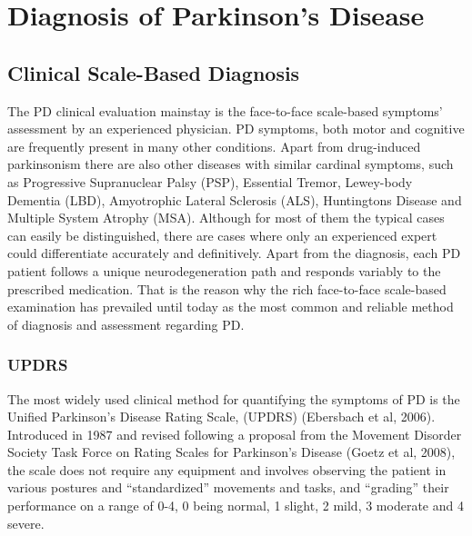 \chapter{Diagnosis of Parkinson's Disease}
\label{ch:diagnosis}
\pagestyle{fancy}
\fancyhf{}
\fancyhead[OC]{\leftmark}
\fancyhead[EC]{\rightmark}
\cfoot{\thepage}


\section{Clinical Scale-Based Diagnosis}
\label{sec:scaleBased}
The \gls{PD} clinical evaluation mainstay is the face-to-face scale-based symptoms' assessment by an experienced physician. \gls{PD} symptoms, both motor and cognitive are frequently present in many other conditions. Apart from drug-induced parkinsonism there are also other diseases with similar cardinal symptoms, such as Progressive Supranuclear Palsy (\gls{PSP}), Essential Tremor, Lewey-body Dementia (\gls{LBD}), Amyotrophic Lateral Sclerosis (\gls{ALS}), Huntingtons Disease and Multiple System Atrophy (\gls{MSA}). Although for most of them the typical cases can easily be distinguished, there are cases where only an experienced expert could differentiate accurately and definitively. Apart from the diagnosis, each \gls{PD} patient follows a unique neurodegeneration path and responds variably to the prescribed medication. That is the reason why the rich face-to-face scale-based examination has prevailed until today as the most common and reliable method of diagnosis and assessment regarding \gls{PD}. 


\subsection{UPDRS}
\label{subsec:updrs}
The most widely used clinical method for quantifying the symptoms of \gls{PD} is the Unified Parkinson's Disease Rating Scale, (\gls{UPDRS}) (Ebersbach et al, 2006). Introduced in 1987 and revised following a proposal from the Movement Disorder Society Task Force on Rating Scales for Parkinson's Disease (Goetz et al, 2008), the scale does not require any equipment and involves observing the patient in various postures and ``standardized'' movements and tasks, and ``grading'' their performance on a range of 0-4, 0 being normal, 1 slight, 2 mild, 3 moderate and 4 severe.

